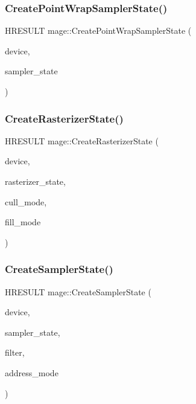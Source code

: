 \hypertarget{namespacemage_a172296a60b063da1f01ad0a4ec828772}{}\label{namespacemage_a172296a60b063da1f01ad0a4ec828772} 
\subsubsection{\texorpdfstring{Create\+Point\+Wrap\+Sampler\+State()}{CreatePointWrapSamplerState()}}
{\footnotesize\ttfamily H\+R\+E\+S\+U\+LT mage\+::\+Create\+Point\+Wrap\+Sampler\+State (\begin{DoxyParamCaption}\item[{I\+D3\+D11\+Device2 $\ast$}]{device,  }\item[{I\+D3\+D11\+Sampler\+State $\ast$$\ast$}]{sampler\+\_\+state }\end{DoxyParamCaption})}

\hypertarget{namespacemage_a801f8c5a484129ae6717733de626b625}{}\label{namespacemage_a801f8c5a484129ae6717733de626b625} 
\subsubsection{\texorpdfstring{Create\+Rasterizer\+State()}{CreateRasterizerState()}}
{\footnotesize\ttfamily H\+R\+E\+S\+U\+LT mage\+::\+Create\+Rasterizer\+State (\begin{DoxyParamCaption}\item[{I\+D3\+D11\+Device2 $\ast$}]{device,  }\item[{I\+D3\+D11\+Rasterizer\+State $\ast$$\ast$}]{rasterizer\+\_\+state,  }\item[{D3\+D11\+\_\+\+C\+U\+L\+L\+\_\+\+M\+O\+DE}]{cull\+\_\+mode,  }\item[{D3\+D11\+\_\+\+F\+I\+L\+L\+\_\+\+M\+O\+DE}]{fill\+\_\+mode }\end{DoxyParamCaption})}

\hypertarget{namespacemage_aba8cfdff9edf018ab6ebe2f3f72a2095}{}\label{namespacemage_aba8cfdff9edf018ab6ebe2f3f72a2095} 
\subsubsection{\texorpdfstring{Create\+Sampler\+State()}{CreateSamplerState()}}
{\footnotesize\ttfamily H\+R\+E\+S\+U\+LT mage\+::\+Create\+Sampler\+State (\begin{DoxyParamCaption}\item[{I\+D3\+D11\+Device2 $\ast$}]{device,  }\item[{I\+D3\+D11\+Sampler\+State $\ast$$\ast$}]{sampler\+\_\+state,  }\item[{D3\+D11\+\_\+\+F\+I\+L\+T\+ER}]{filter,  }\item[{D3\+D11\+\_\+\+T\+E\+X\+T\+U\+R\+E\+\_\+\+A\+D\+D\+R\+E\+S\+S\+\_\+\+M\+O\+DE}]{address\+\_\+mode }\end{DoxyParamCaption})}

